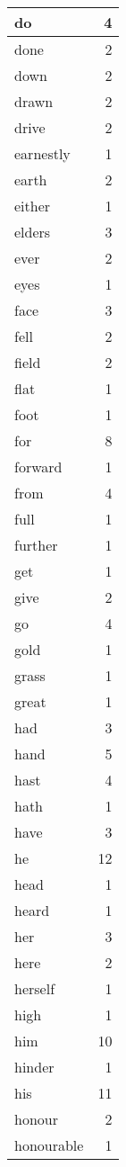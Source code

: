\begin{center}
\begin{longtable}{l|r}
do & 4\\ \hline 
done & 2\\ \hline 
down & 2\\ \hline 
drawn & 2\\ \hline 
drive & 2\\ \hline 
earnestly & 1\\ \hline 
earth & 2\\ \hline 
either & 1\\ \hline 
elders & 3\\ \hline 
ever & 2\\ \hline 
eyes & 1\\ \hline 
face & 3\\ \hline 
fell & 2\\ \hline 
field & 2\\ \hline 
flat & 1\\ \hline 
foot & 1\\ \hline 
for & 8\\ \hline 
forward & 1\\ \hline 
from & 4\\ \hline 
full & 1\\ \hline 
further & 1\\ \hline 
get & 1\\ \hline 
give & 2\\ \hline 
go & 4\\ \hline 
gold & 1\\ \hline 
grass & 1\\ \hline 
great & 1\\ \hline 
had & 3\\ \hline 
hand & 5\\ \hline 
hast & 4\\ \hline 
hath & 1\\ \hline 
have & 3\\ \hline 
he & 12\\ \hline 
head & 1\\ \hline 
heard & 1\\ \hline 
her & 3\\ \hline 
here & 2\\ \hline 
herself & 1\\ \hline 
high & 1\\ \hline 
him & 10\\ \hline 
hinder & 1\\ \hline 
his & 11\\ \hline 
honour & 2\\ \hline 
honourable & 1\\ \hline 

\end{longtable}
\end{center}
